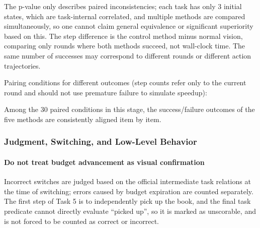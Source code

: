 The p-value only describes paired inconsistencies; each task has only 3 initial states, which are task-internal correlated, and multiple methods are compared simultaneously, so one cannot claim general equivalence or significant superiority based on this. The step difference is the control method minus normal vision, comparing only rounds where both methods succeed, not wall-clock time. The same number of successes may correspond to different rounds or different action trajectories.

Pairing conditions for different outcomes (step counts refer only to the current round and should not use premature failure to simulate speedup):

Among the 30 paired conditions in this stage, the success/failure outcomes of the five methods are consistently aligned item by item.

\subsubsection{Judgment, Switching, and Low-Level Behavior}\label{s12-detail-11}

\paragraph{Do not treat budget advancement as visual confirmation}\label{s12-detail-12}

Incorrect switches are judged based on the official intermediate task relations at the time of switching; errors caused by budget expiration are counted separately. The first step of Task 5 is to independently pick up the book, and the final task predicate cannot directly evaluate ``picked up'', so it is marked as unscorable, and is not forced to be counted as correct or incorrect.

